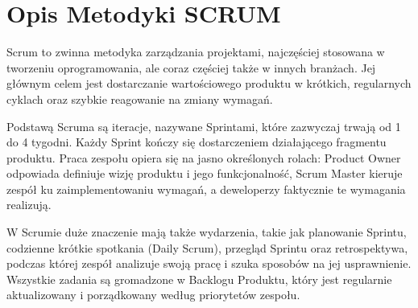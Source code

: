 \newpage

\section{Opis Metodyki SCRUM}

Scrum to zwinna metodyka zarządzania projektami, najczęściej stosowana w tworzeniu oprogramowania, ale coraz częściej także w innych branżach. Jej głównym celem jest dostarczanie wartościowego produktu w krótkich, regularnych cyklach oraz szybkie reagowanie na zmiany wymagań.

Podstawą Scruma są iteracje, nazywane Sprintami, które zazwyczaj trwają od 1 do 4 tygodni. Każdy Sprint kończy się dostarczeniem działającego fragmentu produktu. Praca zespołu opiera się na jasno określonych rolach: Product Owner odpowiada definiuje wizję produktu i jego funkcjonalność, Scrum Master kieruje zespół ku zaimplementowaniu wymagań, a deweloperzy faktycznie te wymagania realizują.

W Scrumie duże znaczenie mają także wydarzenia, takie jak planowanie Sprintu, codzienne krótkie spotkania (Daily Scrum), przegląd Sprintu oraz retrospektywa, podczas której zespół analizuje swoją pracę i szuka sposobów na jej usprawnienie. Wszystkie zadania są gromadzone w Backlogu Produktu,  który jest regularnie aktualizowany i porządkowany według priorytetów zespołu.
